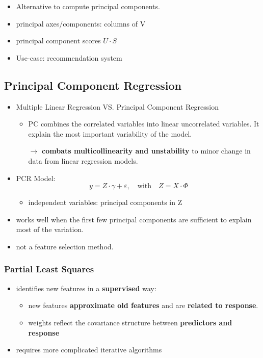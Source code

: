 \begin{itemize}
	\item Alternative to compute principal components.
	\item principal axes/components: columns of V
	\item principal component scores $U\cdot S$
	\item Use-case: recommendation system
\end{itemize}
\subsection{Principal Component Regression}
\begin{itemize}
	\item Multiple Linear Regression VS. Principal Component Regression
	\begin{itemize}
		\item PC combines the correlated variables into linear uncorrelated variables. It explain the most important variability of the model. 
		
		$\rightarrow$ \textbf{combats multicollinearity and unstability} to minor change in data from linear regression models. 
	\end{itemize}
	\item PCR Model:
	$$y = Z \cdot \gamma + \varepsilon,  \quad \text{with} \quad Z = X \cdot \Phi  $$
	\begin{itemize}
		\item independent variables: principal components in Z
	\end{itemize}
	\item works well when the first few principal components are sufficient to explain most of the variation.
	\item not a feature selection method.
\end{itemize}

\subsubsection{Partial Least Squares}
\begin{itemize}
	\item identifies new features in a \textbf{supervised} way:
	\begin{itemize}
		\item new features \textbf{approximate old features} and are \textbf{related to response}.
		\item weights reflect the covariance structure between \textbf{predictors and response}
	\end{itemize}
	\item requires more complicated iterative algorithms
\end{itemize}


